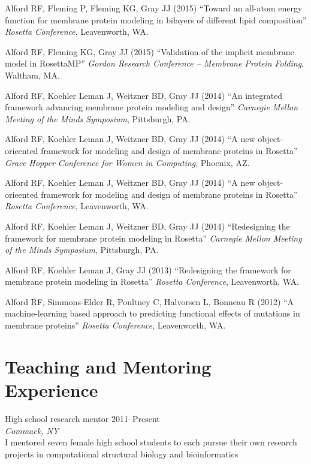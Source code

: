 \documentclass[11pt]{article}
\newcommand{\allcapsspacing}[1]{{\addfontfeature{LetterSpace=7.5}#1}}
\newcommand{\outreachitem}[4]{
{#1} \hfill {#2} \\
#3 \smallskip
#4 
\par\vspace{0.5\baselineskip}}
\newcommand{\researchitem}[4]{
\outreachitem{#1}{#2}{\textit{#3}}{\vspace{0\baselineskip}#4}}
\begin{document}
\begin{etaremune}
\item Alford RF, Fleming P, Fleming KG, Gray JJ (2015) ``Toward an all-atom energy function for membrane protein modeling in bilayers of different lipid composition'' \textit{Rosetta Conference}, Leavenworth, WA.
\item Alford RF, Fleming KG, Gray JJ (2015) ``Validation of the implicit membrane model in RosettaMP'' \textit{Gordon Research Conference -- Membrane Protein Folding}, Waltham, MA.
\item Alford RF, Koehler Leman J, Weitzner BD, Gray JJ (2014) ``An integrated framework advancing membrane protein modeling and design'' \textit{Carnegie Mellon Meeting of the Minds Symposium}, Pittsburgh, PA.
\item Alford RF, Koehler Leman J, Weitzner BD, Gray JJ (2014) ``A new object-orieented framework for modeling and design of membrane proteins in Rosetta'' \textit{Grace Hopper Conference for Women in Computing}, Phoenix, AZ.
\item Alford RF, Koehler Leman J, Weitzner BD, Gray JJ (2014) ``A new object-orieented framework for modeling and design of membrane proteins in Rosetta'' \textit{Rosetta Conference}, Leavenworth, WA.
\item Alford RF, Koehler Leman J, Weitzner BD, Gray JJ (2014) ``Redesigning the framework for membrane protein modeling in Rosetta'' \textit{Carnegie Mellon Meeting of the Minds Symposium}, Pittsburgh, PA.
\item Alford RF, Koehler Leman J, Gray JJ (2013) ``Redesigning the framework for membrane protein modeling in Rosetta'' \textit{Rosetta Conference}, Leavenworth, WA.
\item Alford RF, Simmons-Elder R, Poultney C, Halvorsen L, Bonneau R (2012) ``A machine-learning based approach to predicting functional effects of mutations in membrane proteins'' \textit{Rosetta Conference}, Leavenworth, WA.
\end{etaremune}

\section*{\allcapsspacing{Teaching and Mentoring Experience}}

\researchitem{High school research mentor}{2011--Present}{Commack, NY}{\\I mentored seven female high school students to each pursue their own research projects in computational structural biology and bioinformatics}
\end{document}
